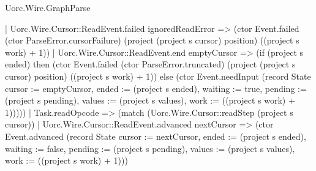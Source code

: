 \begin{lexlean}{Uorc.Wire.GraphParse}
\begin{semanticmodule}
{        | Uorc.Wire.Cursor::ReadEvent.failed ignoredReadError => (ctor Event.failed (ctor ParseError.cursorFailure) (project (project s cursor) position) ((project s work) + 1))
        | Uorc.Wire.Cursor::ReadEvent.end emptyCursor => (if (project s ended) then (ctor Event.failed (ctor ParseError.truncated) (project (project s cursor) position) ((project s work) + 1)) else (ctor Event.needInput (record State {cursor := emptyCursor, ended := (project s ended), waiting := true, pending := (project s pending), values := (project s values), work := ((project s work) + 1)}))))
      | Task.readOpcode => (match (Uorc.Wire.Cursor::readStep (project s cursor))
        | Uorc.Wire.Cursor::ReadEvent.advanced nextCursor => (ctor Event.advanced (record State {cursor := nextCursor, ended := (project s ended), waiting := false, pending := (project s pending), values := (project s values), work := ((project s work) + 1)}))
}
\end{semanticmodule}
\end{lexlean}
